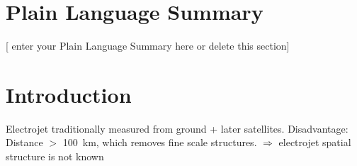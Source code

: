 \documentclass[draft]{agujournal2019}
\begin{document}
\section*{Plain Language Summary}
[ enter your Plain Language Summary here or delete this section]


%
%

%


%
%
%
%


\section{Introduction}
Electrojet traditionally measured from ground + later satellites. Disadvantage: Distance $>$ 100~km, which removes fine scale structures. $\Rightarrow$ electrojet spatial structure is not known
\end{document}

